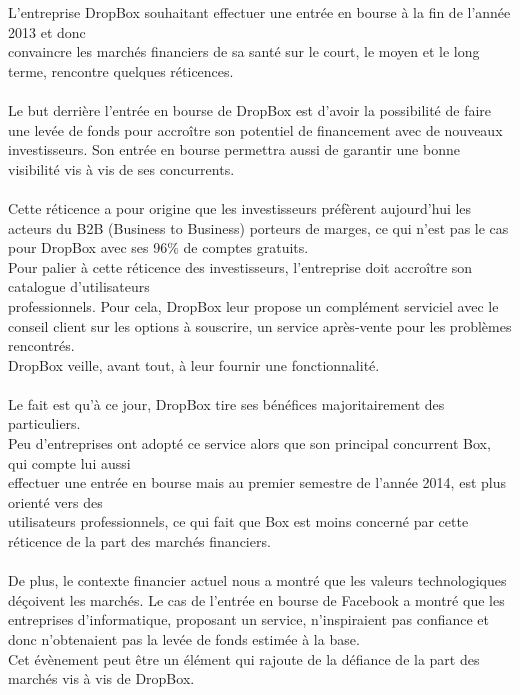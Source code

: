 \documentclass[a4paper, 10pt]{article}
\begin{document}
L'entreprise DropBox souhaitant effectuer une entrée en bourse à la fin de l'année 2013 et
donc\\convaincre les marchés financiers de sa santé sur le court, le moyen et le long terme, rencontre quelques réticences.\\ \\
Le but derrière l'entrée en bourse de DropBox est d'avoir la possibilité de faire une levée de fonds
pour accroître son potentiel de financement avec de nouveaux investisseurs.
Son entrée en bourse permettra aussi de garantir une bonne visibilité vis à vis de ses concurrents.\\ \\
Cette réticence a pour origine que les investisseurs préfèrent aujourd'hui les acteurs du B2B (Business to Business) porteurs de marges,
ce qui n'est pas le cas pour DropBox avec ses 96\% de comptes gratuits.\\
Pour palier à cette réticence des investisseurs, l'entreprise doit accroître son catalogue d'utilisateurs\\professionnels.
Pour cela, DropBox leur propose un complément serviciel avec le conseil client sur les options à souscrire,
un service après-vente pour les problèmes rencontrés.\\
DropBox veille, avant tout, à leur fournir une fonctionnalité.\\ \\
Le fait est qu'à ce jour, DropBox tire ses bénéfices majoritairement des particuliers.\\
Peu d'entreprises ont adopté ce service alors que son principal concurrent Box,
qui compte lui aussi\\effectuer une entrée en bourse mais au premier semestre de l'année 2014,
est plus orienté vers des\\utilisateurs professionnels,
ce qui fait que Box est moins concerné par cette réticence de la part des marchés financiers.\\ \\
De plus, le contexte financier actuel nous a montré que les valeurs technologiques déçoivent les marchés.
Le cas de l'entrée en bourse de Facebook a montré que les entreprises d'informatique, proposant un service,
n'inspiraient pas confiance et donc n'obtenaient pas la levée de fonds estimée à la base.\\
Cet évènement peut être un élément qui rajoute de la défiance de la part des marchés vis à vis de DropBox.\\ \\
\end{document}

